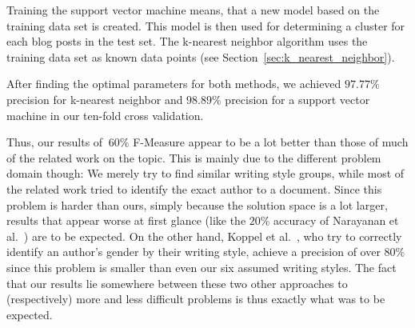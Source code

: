 Training the support vector machine means, that a new model based on the training data set is created.
This model is then used for determining a cluster for each blog posts in the test set.
The k-nearest neighbor algorithm uses the training data set as known data points (see Section~\ref{sec:k_nearest_neighbor}).


After finding the optimal parameters for both methods, we achieved $97.77\%$ precision for k-nearest neighbor and $98.89\%$ precision for a support vector machine in our ten-fold cross validation.


Thus, our results of $~60\%$ F-Measure appear to be a lot better than those of much of the related work on the topic.
This is mainly due to the different problem domain though:
We merely try to find similar writing style groups, while most of the related work tried to identify the exact author to a document.
Since this problem is harder than ours, simply because the solution space is a lot larger, results that appear worse at first glance (like the $20\%$ accuracy of Narayanan et al.~\cite{narayanan2012feasibility}) are to be expected.
On the other hand, Koppel et al.~\cite{koppel2003automatically}, who try to correctly identify an author's gender by their writing style, achieve a precision of over $80\%$ since this problem is smaller than even our six assumed writing styles.
The fact that our results lie somewhere between these two other approaches to (respectively) more and less difficult problems is thus exactly what was to be expected.